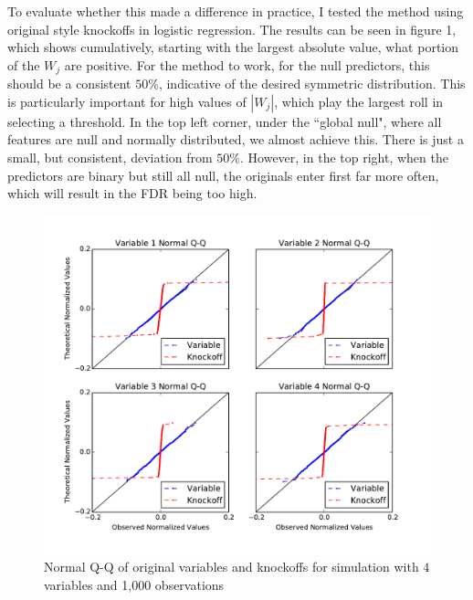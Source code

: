 \documentclass[11pt]{article}
\theoremstyle{definition}
\begin{document}
    \FloatBarrier


    To evaluate whether this made a difference in practice, I tested the method using original style knockoffs in logistic regression. The results can be seen in figure 1, which shows cumulatively, starting with the largest absolute value, what portion of the $W_j$ are positive. For the method to work, for the null predictors, this should be a consistent $50\%$, indicative of the desired symmetric distribution. This is particularly important for high values of $|W_j|$, which play the largest roll in selecting a threshold. In the top left corner, under the ``global null", where all features are null and normally distributed, we almost achieve this. There is just a small, but consistent, deviation from $50\%$. However, in the top right, when the predictors are binary but still all null, the originals enter first far more often, which will result in the FDR being too high. \par
    \begin{figure}[h]
        \begin{center}
            \includegraphics[width=14cm]{images/normalQQ}
            \caption{\linespread{1}\selectfont{}Normal Q-Q of original variables and knockoffs for simulation with $4$ variables and 1,000 observations}
        \end{center}
    \end{figure}
\end{document}
